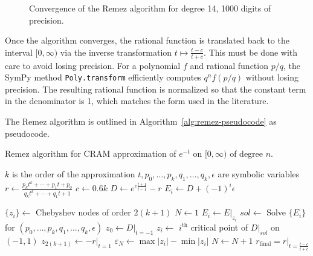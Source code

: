 \begin{figure}[!ht]
\centering
\resizebox{0.9\textwidth}{!}{}
\caption{Convergence of the Remez algorithm for degree 14, 1000 digits of
  precision.}
\label{fig:convergence-14-1000}
\end{figure}

Once the algorithm converges, the rational function is translated back to the
interval $[0, \infty)$ via the inverse transformation $t\mapsto \frac{t - c}{t
  + c}$. This must be done with care to avoid losing precision. For a
polynomial $f$ and rational function $p/q$, the SymPy
method \texttt{Poly.transform} efficiently computes
$q^nf\left(p/q\right)$ without losing precision. The resulting
rational function is normalized so that the constant term in the denominator
is 1, which matches the form used in the literature.~\cite{ationneeded}

The Remez algorithm is outlined in Algorithm~\ref{alg:remez-pseudocode} as pseudocode.

\begin{algorithm}
  \caption{Remez algorithm for CRAM approximation of $e^{-t}$ on $[0, \infty)$
  of degree $n$.}\label{alg:remez-pseudocode}
  \begin{algorithmic}[1]
    \STATE {}
    \STATE $k$ is the order of the approximation
    \STATE \COMMENT{translate $[0, \infty)$ to $[-1, 1)$}
    \STATE $t, p_0, \ldots, p_k, q_1, \ldots, q_k, \epsilon$ are symbolic variables
    \STATE $r \leftarrow \frac{p_kt^k + \cdots + p_1t + p_0}{q_kt^k + \cdots +
      q_1t + 1}$
    \STATE $c \leftarrow 0.6k$
    \STATE $D \leftarrow e^{c\frac{t+1}{t-1}} - r$
    \STATE $E_i \leftarrow D + (-1)^i\epsilon$

    \STATE $\{z_i\} \leftarrow$ Chebyshev nodes of order $2(k+1)$
    \STATE $N \leftarrow 1$
    \REPEAT
      \STATE $E_i \leftarrow E|_{z_i}$
      \STATE $sol \leftarrow$ Solve $\{E_i\}$ for $(p_0,\ldots,p_k,q_1,\ldots,q_k,\epsilon)$
      \STATE $z_0 \leftarrow D|_{t=-1}$
      \STATE $z_i \leftarrow$ $i^\mathrm{th}$ critical point of $D|_{sol}$ on
      $(-1, 1)$ 
      \STATE $z_{2(k + 1)} \leftarrow -r|_{t=1}$ 
      \STATE $\varepsilon_N \leftarrow \max{|z_i|} - \min{|z_i|}$
      \STATE $N \leftarrow N + 1$
    \STATE $r_\mathrm{final} = r|_{t=\frac{t - c}{t + c}}$ \COMMENT{translate $[-1, 1)$ back to $[0, \infty)$ and normalize $q_0=1$}
  \end{algorithmic}
\end{algorithm}
